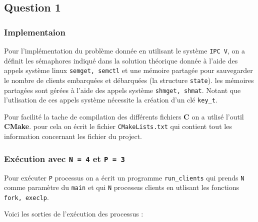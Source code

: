 \subsection{Question 1}
\subsubsection{Implementaion}
Pour l'implémentation du problème donnée en utilisant le système \texttt{IPC V},
on a définit les sémaphores indiqué dans la solution théorique donnée à l'aide
des appels système  linux \texttt{semget, semctl} et une mémoire partagée pour
sauvegarder le nombre de clients embarquées et débarquées (la structure
\texttt{state}). les mémoires partagées sont gérées à l'aide des appels système 
\texttt{shmget, shmat}. Notant que l'utlisation de ces appels système nécessite la création d'un clé \texttt{key\_t}.

Pour facilité la tache de compilation des différents fichiers \textbf{C} on a
utlisé l'outil \textbf{CMake}. pour cela on écrit le fichier
\texttt{CMakeLists.txt} qui contient tout les information concernant les fichier
du project.

\subsubsection{Exécution avec \texttt{N = 4} et \texttt{P = 3}}
Pour exécuter \texttt{P} processus on a écrit un programme \texttt{run\_clients}
qui prends \texttt{N} comme  paramètre du \texttt{main} et qui \texttt{N}
processus clients en utlisant les fonctions \texttt{fork, execlp}.

Voici les sorties de l'exécution des processus :





